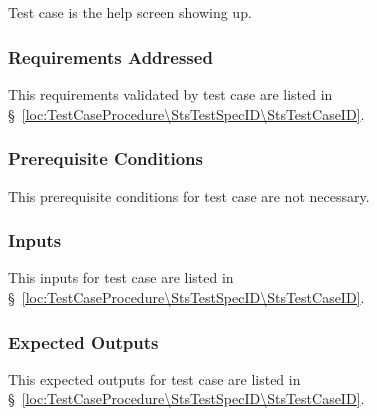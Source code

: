 
\subsection{\StsTestCaseID}
\label{loc:Test\StsTestCaseID}


Test \StsTestSpecID{} case \StsTestCaseID{} is the help screen showing up.

\subsubsection{Requirements Addressed}
\label{loc:TestCaseRequirementsAddressed\StsTestSpecID\StsTestCaseID}


This requirements validated by test \StsTestSpecID{} case \StsTestCaseID{} are listed in \S~\ref{loc:TestCaseProcedure\StsTestSpecID\StsTestCaseID}.

\subsubsection{Prerequisite Conditions}
\label{loc:TestCasePrerequisiteConditions\StsTestSpecID\StsTestCaseID}


This prerequisite conditions for test \StsTestSpecID{} case \StsTestCaseID{} are not necessary.

\subsubsection{Inputs}
\label{loc:TestCaseInputs\StsTestSpecID\StsTestCaseID}


This inputs for test \StsTestSpecID{} case \StsTestCaseID{} are listed in \S~\ref{loc:TestCaseProcedure\StsTestSpecID\StsTestCaseID}.

\subsubsection{Expected Outputs}
\label{loc:TestCaseExpectedOutputs\StsTestSpecID\StsTestCaseID}


This expected outputs for test \StsTestSpecID{} case \StsTestCaseID{} are listed in \S~\ref{loc:TestCaseProcedure\StsTestSpecID\StsTestCaseID}.

